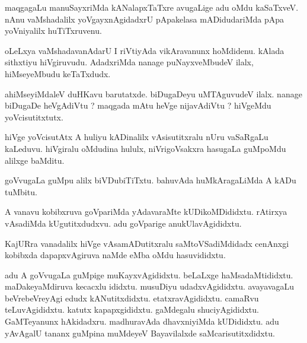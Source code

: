 \documentclass{article}
\begin{document}
\begin{mn}
maqgagaLu  manuSayxriMda  kANalapxTaTxre  avugaLige  adu  oMdu  kaSaTxveV.  nAnu  vaMshadalilx  
yoVgayxnAgidadxrU  pApakelasa  mADidudariMda  pApa  yoVniyalilx  huTiTxruvenu.
\end{mn}

\begin{mn}
oLeLxya  vaMshadavanAdarU  I riVtiyAda  vikAravanunx  hoMdidenu.  kAlada  sithxtiyu  
hiVgiruvudu.  AdadxriMda  nanage  puNayxveMbudeV ilalx,   hiMseyeMbudu  keTaTxdudx.
\end{mn}

\begin{mn}
ahiMseyiMdaleV  duHKavu  barutatxde.  biDugaDeyu  uMTAguvudeV  ilalx.  nanage  
biDugaDe  heVgAdiVtu ?  maqgada  mAtu  heVge  nijavAdiVtu ?  hiVgeMdu  yoVcisutitxtutx.
\end{mn}

\begin{mn}
hiVge  yoVcisutAtx  A  huliyu  kADinalilx  vAsisutitxralu  nUru  vaSaRgaLu  kaLeduvu.  
hiVgiralu  oMdudina  hululx,  niVrigoVsakxra  hasugaLa  guMpoMdu  alilxge  baMditu.
\end{mn}

\begin{mn}
goVvugaLa  guMpu  alilx  biVDubiTiTxtu.  bahuvAda  huMkAragaLiMda  A  kADu  tuMbitu.
\end{mn}

\begin{mn}
A vanavu kobibxruva  goVpariMda  yAdavaraMte  kUDikoMDididxtu.  rAtirxya  
vAsadiMda  kUgutitxdudxvu.  adu  goVparige  anukUlavAgididxtu. 
\end{mn}

\begin{mn}
KajURra  vanadalilx  hiVge  vAsamADutitxralu  saMtoVSadiMdidadx  cenAnxgi  
kobibxda  dapapxvAgiruva  naMde  eMba  oMdu  hasuvididxtu.
\end{mn}

\begin{mn}
adu  A  goVvugaLa  guMpige  muKayxvAgididxtu.  beLaLxge  haMsadaMtididxtu.  
maDakeyaMdiruva  kecacxlu  ididxtu.  musuDiyu  udadxvAgididxtu.  avayavagaLu  
beVrebeVreyAgi  edudx  kANutitxdidxtu.  etatxravAgididxtu.  camaRvu  teLuvAgididxtu.  
katutx  kapapxgididxtu.  gaMdegalu  shuciyAgididxtu.  GaMTeyanunx  hAkidadxru.  
madhuravAda  dhavxniyiMda  kUDididxtu.  adu  yAvAgalU  tananx  guMpina  
muMdeyeV  Bayavilalxde  saMcarisutitxdidxtu.
\end{mn}
\end{document}
